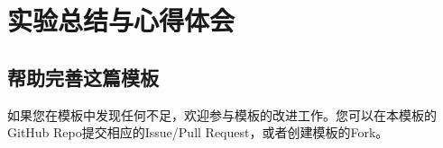 \section{实验总结与心得体会}

\subsection{帮助完善这篇模板}

如果您在模板中发现任何不足，欢迎参与模板的改进工作。您可以在本模板的GitHub Repo提交相应的Issue/Pull Request，或者创建模板的Fork。
